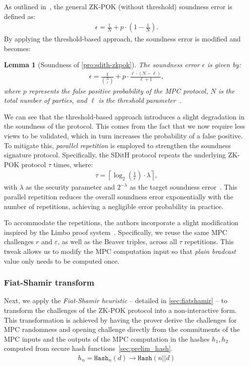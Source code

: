 \documentclass[11pt]{report}
\theoremstyle{definition}
\theoremstyle{plain}
\newtheorem{lemma}{Lemma}[section]
\begin{document}
As outlined in~\cite{feneuil2023threshold}, the general ZK-POK (without threshold) soundness error is defined as:
\begin{align*}
  \epsilon = \frac{1}{N} + p \cdot \left(1 - \frac{1}{N}\right).
\end{align*}
By applying the threshold-based approach, the soundness error is modified and becomes:
\begin{lemma}[Soundness of \autoref{pro:sdith-zkpok}]
  The soundness error $\epsilon$ is given by:
  \begin{align*}
    \epsilon = \frac{1}{\binom{N}{\ell}} + p \cdot \frac{\ell \cdot (N - \ell)}{\ell + 1},
  \end{align*}
  where $p$ represents the false positive probability of the MPC protocol, $N$ is the total number of parties, and $\ell$ is the threshold parameter~\cite{feneuil2023threshold}.
\end{lemma}
We can see that the threshold-based approach introduces a slight degradation in the soundness of the protocol. This comes from the fact that we now require less views to be validated, which in turn increases the probability of a false positive.
To mitigate this, \textit{parallel repetition} is employed to strengthen the soundness signature protocol. Specifically, the SDitH protocol repeats the underlying ZK-POK protocol $\tau$ times, where:
\begin{align*}
  \tau = \left\lceil \log_2\left(\frac{1}{\epsilon}\right) \cdot \lambda \right\rceil,
\end{align*}
with $\lambda$ as the security parameter and $2^{-\lambda}$ as the target soundness error~\cite{aguilarsyndrome11}. This parallel repetition reduces the overall soundness error exponentially with the number of repetitions, achieving a negligible error probability in practice.

To accommodate the repetitions, the authors incorporate a slight modification inspired by the Limbo proof system~\cite{delpech2021limbo}. Specifically, we reuse the same MPC challenges $r$ and $\varepsilon$, as well as the Beaver triples, across all $\tau$ repetitions. This tweak allows us to modify the MPC computation input so that \textit{plain bradcast} value only needs to be computed once.

\subsubsection{Fiat-Shamir transform}
Next, we apply the \textit{Fiat-Shamir heuristic} -- detailed in \autoref{sec:fiatshamir} -- to transform the challenges of the ZK-POK protocol into a non-interactive form. This transformation is achieved by having the prover derive the challenges for MPC randomness and opening challenge directly from the commitments of the MPC inputs and the outputs of the MPC computation in the hashes $h_1, h_2$ computed from secure hash functions~\autoref{sec:prelim_hash}.
\begin{align}
  h_n = \texttt{Hash}_n(d) \rightarrow \texttt{Hash}(n || d)\label{eq:fiatshamirhash}
\end{align}
\end{document}

